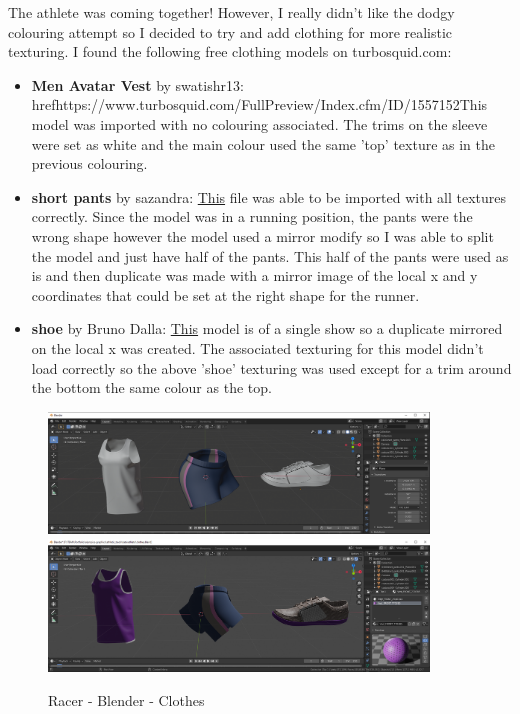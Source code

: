 \documentclass[a4 paper, 12pt]{article}
\begin{document}
The athlete was coming together! However, I really didn't like the dodgy colouring attempt so I decided to try and add clothing for more realistic texturing. I found the following free clothing models on turbosquid.com:
\begin{itemize}
    \item \textbf{Men Avatar Vest} by swatishr13: href{https://www.turbosquid.com/FullPreview/Index.cfm/ID/1557152}{This} model was imported with no colouring associated. The trims on the sleeve were set as white and the main colour used the same 'top' texture as in the previous colouring. 
    \item \textbf{short pants} by sazandra: \href{https://www.turbosquid.com/FullPreview/Index.cfm/ID/1434049}{This} file was able to be imported with all textures correctly. Since the model was in a running position, the pants were the wrong shape however the model used a mirror modify so I was able to split the model and just have half of the pants. This half of the pants were used as is and then duplicate was made with a mirror image of the local x and y coordinates that could be set at the right shape for the runner.
    \item \textbf{shoe} by Bruno Dalla: \href{https://www.turbosquid.com/FullPreview/Index.cfm/ID/1217043}{This} model is of a single show so a duplicate mirrored on the local x was created. The associated texturing for this model didn't load correctly so the above 'shoe' texturing was used except for a trim around the bottom the same colour as the top.
\end{itemize}


\begin{figure} [H]
    \centering
    \includegraphics[width=0.9\textwidth, frame]
        {./images/olympics/athlete_clothes_base.PNG}
    \includegraphics[width=0.9\textwidth, frame]
        {./images/olympics/athlete_clothes_colour.PNG}    
    \caption{Racer - Blender - Clothes}   
\end{figure}
\end{document}
